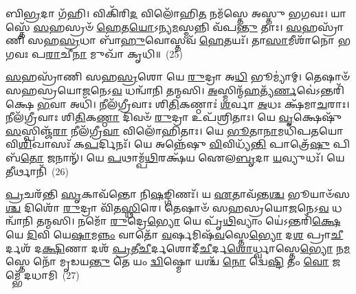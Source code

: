 𑌬𑌿\-\ul{𑌭𑍍𑌰}\-𑌦𑌾 𑌗᳴𑌹𑌿। 𑌵𑌿𑌕𑌿᳴𑌰𑌿\-\ul{𑌦} 𑌵𑌿𑌲𑍋᳴𑌹𑌿\-\ul{𑌤} 𑌨𑌮᳴𑌸𑍍𑌤𑍇 𑌅𑌸𑍍𑌤𑍁 𑌭𑌗𑌵𑌃। 𑌯𑌾𑌸𑍍𑌤𑍇᳴ \ul{𑌸}\-𑌹𑌸𑍍𑌰𑍞᳴ \ul{𑌹𑍇}\-𑌤\-\ul{𑌯𑍋}\-\-𑌽𑌨𑍍𑌯\-\ul{𑌮}\-𑌸𑍍𑌮𑌨𑍍𑌨𑌿 𑌵᳴𑌪\-\ul{𑌨𑍍𑌤𑍁} 𑌤𑌾𑌃। \ul{𑌸}\-𑌹𑌸𑍍𑌰𑌾᳴𑌣𑌿 𑌸𑌹\-\ul{𑌸𑍍𑌰}\-𑌧𑌾 𑌬𑌾᳴\-\ul{𑌹𑍁}\-𑌵𑍋𑌸𑍍𑌤𑌵᳴ \ul{𑌹𑍇}\-𑌤𑌯𑌃᳴। 𑌤𑌾\-\ul{𑌸𑌾}\-𑌮𑍀𑌶𑌾᳴𑌨𑍋 𑌭𑌗𑌵𑌃 𑌪\-\ul{𑌰𑌾}\-𑌚𑍀\-\ul{𑌨𑌾} 𑌮𑍁𑌖𑌾᳴ 𑌕𑍃𑌧𑌿॥~(25)

{\anuvakamend[{\-\ul{𑌅}\-𑌸𑍍𑌮𑌿𑍟 \ul{𑌸𑍍𑌤}\-𑌨𑍁𑌵𑌃᳴ \ul{𑌸𑍍𑌤𑍁}\-𑌹𑌿 𑌪𑌿𑌨𑌾᳴\-\ul{𑌕}\-𑌮𑍇\-\ul{𑌕𑌾}\-𑌨𑍍𑌨\-\ul{𑌤𑍍𑌰𑌿}\-\-\ul{𑍞}\-𑌶𑌚𑍍𑌚᳴}]}%

\-\ul{𑌸}\-𑌹𑌸𑍍𑌰𑌾᳴𑌣𑌿 𑌸𑌹\-\ul{𑌸𑍍𑌰}\-𑌶𑍋 𑌯𑍇 \ul{𑌰𑍁}\-𑌦𑍍𑌰𑌾 𑌅\-\ul{𑌧𑌿} 𑌭𑍂𑌮𑍍𑌯𑌾॑𑌮𑍍। 𑌤𑍇𑌷𑌾𑍞᳴ 𑌸𑌹𑌸𑍍𑌰𑌯𑍋\-\ul{𑌜}\-𑌨𑍇\-𑌽\-\ul{𑌵} 𑌧𑌨𑍍𑌵𑌾᳴𑌨𑌿 𑌤𑌨𑍍𑌮𑌸𑌿। \ul{𑌅}\-𑌸𑍍𑌮𑌿𑌨𑍍𑌮᳴\-\ul{𑌹}\-𑌤𑍍𑌯᳴\-\ul{𑌰𑍍𑌣}\-𑌵𑍇॑\-𑌽\-𑌨𑍍𑌤𑌰𑌿᳴𑌕𑍍𑌷𑍇 \ul{𑌭}\-𑌵𑌾 𑌅𑌧𑌿᳴। 𑌨𑍀𑌲᳴𑌗𑍍𑌰𑍀𑌵𑌾𑌃 𑌶𑌿\-\ul{𑌤𑌿}\-𑌕𑌣𑍍𑌠𑌾𑌃॑ \ul{𑌶}\-𑌰𑍍𑌵𑌾 \ul{𑌅}\-𑌧𑌃 𑌕𑍍𑌷᳴𑌮𑌾\-\ul{𑌚}\-𑌰𑌾𑌃। 𑌨𑍀𑌲᳴𑌗𑍍𑌰𑍀𑌵𑌾𑌃 𑌶𑌿\-\ul{𑌤𑌿}\-𑌕\-\ul{𑌣𑍍𑌠𑌾} 𑌦𑌿𑌵𑍞᳴ \ul{𑌰𑍁}\-𑌦𑍍𑌰𑌾 𑌉𑌪᳴𑌶𑍍𑌰𑌿𑌤𑌾𑌃। 𑌯𑍇 \ul{𑌵𑍃}\-𑌕𑍍𑌷𑍇𑌷𑍁᳴ \ul{𑌸}\-𑌸𑍍𑌪𑌿𑌞𑍍𑌜᳴\-\ul{𑌰𑌾} 𑌨𑍀𑌲᳴𑌗𑍍𑌰𑍀\-\ul{𑌵𑌾} 𑌵𑌿𑌲𑍋᳴𑌹𑌿𑌤𑌾𑌃। 𑌯𑍇 \ul{𑌭𑍂}\-𑌤𑌾\-\ul{𑌨𑌾}\-𑌮𑌧𑌿᳴𑌪𑌤𑌯𑍋 𑌵𑌿\-\ul{𑌶𑌿}\-𑌖𑌾𑌸𑌃᳴ 𑌕\-\ul{𑌪}\-𑌰𑍍𑌦𑌿𑌨𑌃᳴। 𑌯𑍇 𑌅𑌨𑍍𑌨𑍇᳴𑌷𑍁 \ul{𑌵𑌿}\-𑌵𑌿𑌧𑍍𑌯᳴\-\ul{𑌨𑍍𑌤𑌿} 𑌪𑌾𑌤𑍍𑌰𑍇᳴\-\ul{𑌷𑍁} 𑌪𑌿𑌬᳴\-\ul{𑌤𑍋} 𑌜𑌨𑌾𑌨𑍍᳴। 𑌯𑍇 \ul{𑌪}\-𑌥𑌾𑌮𑍍𑌪᳴\-\ul{𑌥𑌿}\-𑌰𑌕𑍍𑌷᳴𑌯 𑌐𑌲\-\ul{𑌬𑍃}\-𑌦𑌾 \ul{𑌯}\-𑌵𑍍𑌯𑍁𑌧𑌃᳴। 𑌯𑍇 \ul{𑌤𑍀}\-𑌰𑍍𑌥𑌾𑌨𑌿᳴~(26)

\-\ul{𑌪𑍍𑌰}\-𑌚𑌰᳴𑌨𑍍𑌤𑌿 \ul{𑌸𑍃}\-𑌕𑌾𑌵᳴𑌨𑍍𑌤𑍋 𑌨𑌿\-\ul{𑌷}\-𑌙𑍍𑌗𑌿𑌣𑌃᳴। 𑌯 \ul{𑌏}\-𑌤𑌾𑌵᳴𑌨𑍍𑌤\-\ul{𑌶𑍍𑌚} 𑌭𑍂𑌯𑌾𑍞᳴𑌸\-\ul{𑌶𑍍𑌚} 𑌦𑌿𑌶𑍋᳴ \ul{𑌰𑍁}\-𑌦𑍍𑌰𑌾 𑌵𑌿᳴𑌤\-\ul{𑌸𑍍𑌥𑌿}\-𑌰𑍇। 𑌤𑍇𑌷𑌾𑍞᳴ 𑌸𑌹𑌸𑍍𑌰𑌯𑍋\-\ul{𑌜}\-𑌨𑍇\-𑌽\-\ul{𑌵} 𑌧𑌨𑍍𑌵𑌾᳴𑌨𑌿 𑌤𑌨𑍍𑌮𑌸𑌿। 𑌨𑌮𑍋᳴ \ul{𑌰𑍁}\-𑌦𑍍𑌰𑍇\-\ul{𑌭𑍍𑌯𑍋} 𑌯𑍇 𑌪𑍃᳴\-\ul{𑌥𑌿}\-𑌵𑍍𑌯𑌾𑌂 𑌯𑍇॑\-𑌽𑌨𑍍𑌤𑌰𑌿᳴\-\ul{𑌕𑍍𑌷𑍇} 𑌯𑍇 \ul{𑌦𑌿}\-𑌵𑌿 𑌯𑍇\-\ul{𑌷𑌾}\-𑌮\-\ul{𑌨𑍍𑌨𑌂} 𑌵𑌾𑌤𑍋᳴ \ul{𑌵}\-𑌰𑍍\mbox{}𑌷𑌮𑌿𑌷᳴\-\ul{𑌵}\-𑌸𑍍𑌤𑍇\-\ul{𑌭𑍍𑌯𑍋} 𑌦\-\ul{𑌶} 𑌪𑍍𑌰𑌾\-\ul{𑌚𑍀}\-𑌰𑍍𑌦𑌶᳴ 𑌦\-\ul{𑌕𑍍𑌷𑌿}\-𑌣𑌾 𑌦𑌶᳴ \ul{𑌪𑍍𑌰}\-𑌤𑍀\-\ul{𑌚𑍀}\-𑌰𑍍𑌦𑌶𑍋𑌦𑍀᳴\-\ul{𑌚𑍀}\-𑌰𑍍𑌦\-\ul{𑌶𑍋}\-𑌰𑍍𑌧𑍍𑌵𑌾𑌸𑍍𑌤𑍇\-\ul{𑌭𑍍𑌯𑍋} 𑌨\-\ul{𑌮}\-𑌸𑍍𑌤𑍇 𑌨𑍋᳴ 𑌮𑍃𑌡𑌯\-\ul{𑌨𑍍𑌤𑍁} 𑌤𑍇 𑌯𑌂 \ul{𑌦𑍍𑌵𑌿}\-𑌷𑍍𑌮𑍋 𑌯𑌶𑍍𑌚᳴ \ul{𑌨𑍋} 𑌦𑍍𑌵𑍇\-\ul{𑌷𑍍𑌟𑌿} 𑌤𑌂 \ul{𑌵𑍋} 𑌜𑌮𑍍𑌭𑍇᳴ 𑌦𑌧𑌾𑌮𑌿~(27)


{\anuvakamend[{\-\ul{𑌤𑍀}\-𑌰𑍍𑌥𑌾\-\ul{𑌨𑌿} 𑌯\-\ul{𑌶𑍍𑌚} 𑌷𑌟𑍍𑌚᳴}]}%

{}

